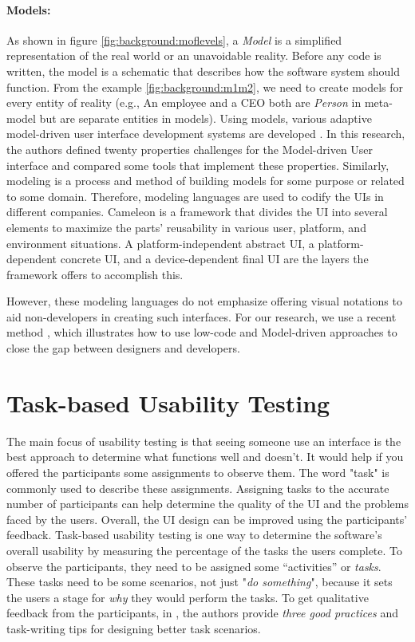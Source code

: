 \paragraph{Models: } 
As shown in figure \ref{fig:background:moflevels}, a \textit{Model} is a simplified representation of the real world or an unavoidable reality.
Before any code is written, the model is a schematic that describes how the software system should function.
From the example \ref{fig:background:m1m2}, we need to create models for every entity of reality (e.g., An employee and a CEO both are \textit{Person} in meta-model but are separate entities in models).
Using models, various adaptive model-driven user interface development systems are developed \cite{article:mbse:akiki}.
In this research, the authors defined twenty properties challenges for the Model-driven User interface and compared some tools that implement these properties.
Similarly, modeling is a process and method of building models for some purpose or related to some domain.
Therefore, modeling languages are used to codify the UIs in different companies. 
Cameleon \cite{article:cameleon:balme} is a framework that divides the UI into several elements to maximize the parts' reusability in various user, platform, and environment situations.
A platform-independent abstract UI, a platform-dependent concrete UI, and a device-dependent final UI are the layers the framework offers to accomplish this.

However, these modeling languages do not emphasize offering visual notations to aid non-developers in creating such interfaces. 
For our research, we use a recent method \cite{article:mbse:bexiga}, which illustrates how to use low-code and Model-driven approaches to close the gap between designers and developers.

\clearpage
\section{Task-based Usability Testing}
\label{background:section:task}
The main focus of usability testing is that seeing someone use an interface is the best approach to determine what functions well and doesn't. 
It would help if you offered the participants some assignments to observe them. 
The word "task" is commonly used to describe these assignments.
Assigning tasks to the accurate number of participants can help determine the quality of the UI and the problems faced by the users. 
Overall, the UI design can be improved using the participants' feedback. 
Task-based usability testing is one way to determine the software's overall usability \cite{article:usability:doesburg} by measuring the percentage of the tasks the users complete.
To observe the participants, they need to be assigned some ``activities'' or \textit{tasks}. 
These tasks need to be some scenarios, not just "\textit{do something}", because it sets the users a stage for \textit{why} they would perform the tasks. 
To get qualitative feedback from the participants, in \cite{misc:usability:tasks}, the authors provide \textit{three good practices} and task-writing tips for designing better task scenarios.

